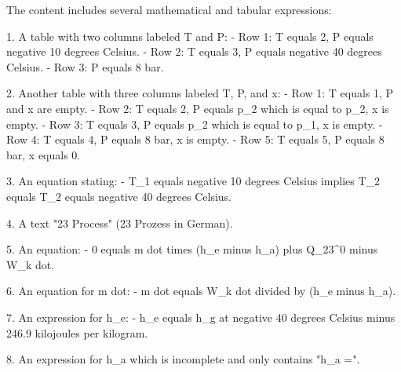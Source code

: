 The content includes several mathematical and tabular expressions:

1. A table with two columns labeled T and P:
   - Row 1: T equals 2, P equals negative 10 degrees Celsius.
   - Row 2: T equals 3, P equals negative 40 degrees Celsius.
   - Row 3: P equals 8 bar.

2. Another table with three columns labeled T, P, and x:
   - Row 1: T equals 1, P and x are empty.
   - Row 2: T equals 2, P equals p_2 which is equal to p_2, x is empty.
   - Row 3: T equals 3, P equals p_2 which is equal to p_1, x is empty.
   - Row 4: T equals 4, P equals 8 bar, x is empty.
   - Row 5: T equals 5, P equals 8 bar, x equals 0.

3. An equation stating:
   - T_1 equals negative 10 degrees Celsius implies T_2 equals T_2 equals negative 40 degrees Celsius.

4. A text "23 Process" (23 Prozess in German).

5. An equation:
   - 0 equals m dot times (h_e minus h_a) plus Q_23^0 minus W_k dot.

6. An equation for m dot:
   - m dot equals W_k dot divided by (h_e minus h_a).

7. An expression for h_e:
   - h_e equals h_g at negative 40 degrees Celsius minus 246.9 kilojoules per kilogram.

8. An expression for h_a which is incomplete and only contains "h_a =".